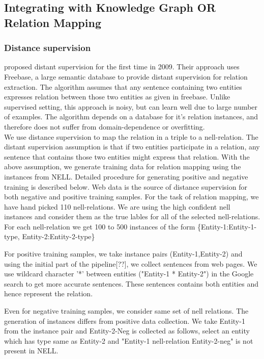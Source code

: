 \subsection{Integrating with Knowledge Graph OR Relation Mapping}
\label{sec:rel-map}
\subsubsection{ Distance supervision}
\cite{mintz2009distant} proposed distant supervision for the first time in 2009. Their approach uses Freebase, a large semantic database to provide distant supervision for relation extraction. The algorithm
assumes that any sentence containing two entities expresses relation between those two entities as given in freebase.
Unlike supervised setting, this approach is noisy, but can learn well due to large number of examples. 
The algorithm depends on a database for it’s relation instances, and therefore does not suffer from domain-dependence or overfitting.\\
We use distance supervision to map the relation in a triple to a nell-relation. 
The distant supervision assumption is that if two entities participate in a relation, any sentence that contains those two entities might express that relation.
With the above assumption, we generate training data for relation mapping using the instances from NELL. Detailed procedure for generating positive and negative training 
is described below.
Web data is the source of distance supervision for both negative and positive training samples.
For the task of relation mapping, we have hand picked 110 nell-relations.
We are using the high confident nell instances and consider them as the true lables for all of the selected nell-relations.
For each nell-relation we get 100 to 500 instances of the form \{Entity-1:Entity-1-type, Entity-2:Entity-2-type\}


For positive training samples, we take instance pairs (Entity-1,Entity-2) and using the initial part of the pipeline[??], we collect
sentences from web pages. We use wildcard character '*' between entities ("Entity-1 * Entity-2") in the Google search to get more accurate sentences. These sentences contains both entities and hence represent the relation.

Even for negative training samples, we consider same set of nell relations. The generation of instances differs from positive data collection. We take Entity-1 from the instance pair and
Entity-2-Neg is collected as follows, select an entity which has type same as Entity-2 and "Entity-1 nell-relation Entity-2-neg" is not present in NELL.

